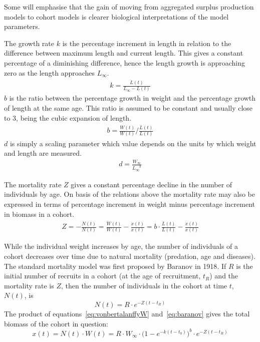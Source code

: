 \documentclass[11pt,fleqn]{book} %
\begin{document}
\begin{corollary}
\hfill \break
\small{\indent Some will emphasise that the gain of moving from aggregated surplus production models to cohort models is clearer biological interpretations of the model parameters.

The growth rate $k$ is the percentage increment in length in relation to the difference between maximum length and current length. This gives a constant percentage of a diminishing difference, hence the length growth is approaching zero as the length approaches $L_\infty$.
\begin{align*}
k = \frac{\dot{L}(t)}{L_\infty - L(t)}
\end{align*}
$b$ is the ratio between the percentage growth in weight and the percentage growth of length at the same age. This ratio is assumed to be constant and usually close to 3, being the cubic expansion of length.
\begin{align*}
b = \frac{\dot{W}(t)}{W(t)} \bigg/ \frac{\dot{L}(t)}{L(t)}
\end{align*}
$d$ is simply a scaling parameter which value depends on the units by which weight and length are measured.
\begin{align*}
d = \frac{W_\infty}{{L_\infty}^b}
\end{align*}

The mortality rate $Z$ gives a constant percentage decline in the number of individuals by age. On basis of the relations above the mortality rate may also be expressed in terms of percentage increment in weight minus percentage increment in biomass in a cohort.
\begin{align*}
Z = - \frac{\dot{N}(t)}{N(t)} = \frac{\dot{W}(t)}{W(t)} - \frac{\dot{x}(t)}{x(t)} = b \cdot \frac{\dot{L}(t)}{L(t)} - \frac{\dot{x}(t)}{x(t)}
\end{align*}
}
\label{code:k}
\end{corollary}
\hfill \break
While the individual weight increases by age, the number of individuals of a cohort decreases over time due to natural mortality (predation, age and diseases). The standard mortality model was first proposed by Baranov in 1918\cite{Baranov1918}. If $R$ is the initial number of recruits in a cohort (at the age of recruitment, $t_R$) and the mortality rate is $Z$, then the number of individuals in the cohort at time $t$, $N(t)$, is
\begin{equation} 
\label{eq:baranov}
N(t) = R \cdot e^{-Z(t-t_R)}
\end{equation}
The product of equations~\ref{eq:vonbertalanffyW} and~\ref{eq:baranov} gives the total biomass of the cohort in question:
\begin{equation} 
\label{eq:cohort}
x(t) = N(t) \cdot W(t) = R  \cdot W_\infty \cdot \big(1 - e^{-k(t-t_0)}\big)^b \cdot e^{-Z(t-t_R)}
\end{equation}
\end{document}
